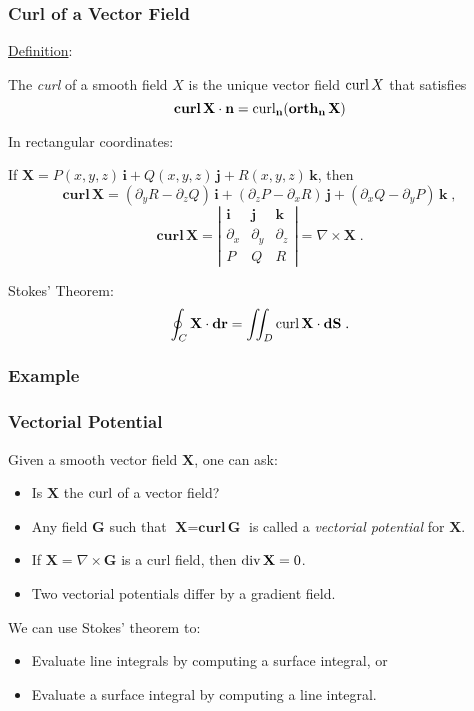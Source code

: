 \begin{frame}
\frametitle{Curl of a Vector Field}

\underline{Definition}:

The \emph{curl} of a smooth field $X$ is the unique vector field $\operatorname{\bm{curl}} X$ that satisfies
%
$$\textbf{curl}\, \textbf{X}\cdot \textbf{n} = \text{curl}_{\textbf{n}} (\operatorname{\textbf{orth}}_{\textbf{n}} \textbf{X})$$

\pause In rectangular coordinates:

If $\textbf{X}=P(x,y,z) \, \textbf{i} + Q(x,y,z)\, \textbf{j} + R(x,y,z)\, \textbf{k}$, then
%
$$
  \textbf{curl}\, \textbf{X} = (\partial_y R - \partial_z Q) \, \textbf{i} +  (\partial_z P - \partial_x R) \, \textbf{j} + (\partial_x Q - \partial_y P) \, \textbf{k} \; ,
$$
%
$$\textbf{curl}\, \textbf{X} = \left| \begin{array}{ccc}
  \textbf{i} & \textbf{j} & \textbf{k} \\
  \partial_x & \partial_y & \partial_z \\
  P & Q & R
\end{array}\right| = \nabla \times \textbf{X}\; .$$
%

\pause Stokes' Theorem:
%
$$\oint_C \textbf{X}\cdot \textbf{dr} = \int\!\!\!\int_D \operatorname{\bm{curl}} \textbf{X} \cdot \textbf{dS}\; .$$
\end{frame}

\begin{frame}
  \frametitle{Example}
\end{frame}



\begin{frame}
  \frametitle{Vectorial Potential}

  Given a smooth vector field $\textbf{X}$, one can ask:
%
\begin{itemize}
  \item Is $\textbf{X}$ the $\operatorname{\bm{curl}}$ of a vector field?
  \item \pause Any field $\textbf{G}$ such that $\textbf{X} = \textbf{curl}\, \textbf{G}$ is called a \emph{vectorial potential} for $\textbf{X}$.
  \item \pause If $\textbf{X}=\nabla \times \textbf{G}$ is a curl field, then $\operatorname{div} \textbf{X} = 0$.
  \item \pause Two vectorial potentials differ by a gradient field.
\end{itemize}
\pause We can use Stokes' theorem to:
\begin{itemize}
  \item \pause Evaluate line integrals by computing a surface integral, or
  \item \pause Evaluate a surface integral by computing a line integral.
\end{itemize}

\end{frame}

